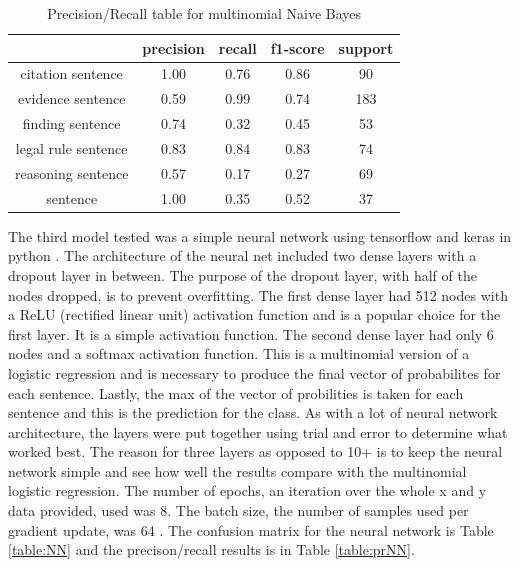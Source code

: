 \documentclass[11pt]{article}
\begin{document}
\vspace{1.4em}
\begin{table}
  \centering
  \begin{tabular}{| c | c | c | c | c |}
    \hline
    &                   precision  &   recall &  f1-score  &  support \\
    \hline
    citation sentence &       1.00 &     0.76 &     0.86 &       90 \\
    evidence sentence &       0.59 &     0.99 &     0.74 &      183 \\
    finding sentence &       0.74 &     0.32 &     0.45 &       53 \\
    legal rule sentence &    0.83 &     0.84 &     0.83 &       74 \\
    reasoning sentence &       0.57 &     0.17 &     0.27 &       69 \\
    sentence           &       1.00 &     0.35 &     0.52 &       37 \\
    \hline
  \end{tabular}
  \caption{Precision/Recall table for multinomial Naive Bayes}
  \label{table:prLR}
\end{table}
\vspace{0.3em}



The third model tested was a simple neural network using tensorflow and keras in python \cite{tensorflow2015-whitepaper}. The architecture of the neural net included two dense layers with a dropout layer in between. The purpose of the dropout layer, with half of the nodes dropped, is to prevent overfitting. The first dense layer had 512 nodes with a ReLU (rectified linear unit) activation function and is a popular choice for the first layer. It is a simple activation function. The second dense layer had only 6 nodes and a softmax activation function. This is a multinomial version of a logistic regression and is necessary to produce the final vector of probabilites for each sentence. Lastly, the max of the vector of probilities is taken for each sentence and this is the prediction for the class. As with a lot of neural network architecture, the layers were put together using trial and error to determine what worked best. The reason for three layers as opposed to 10+ is to keep the neural network simple and see how well the results compare with the multinomial logistic regression. The number of epochs, an iteration over the whole x and y data provided, used was 8. The batch size, the number of samples used per gradient update, was 64 \cite{tensorflow2015-whitepaper}. The confusion matrix for the neural network is Table \ref{table:NN} and the precison/recall results is in Table \ref{table:prNN}.
\end{document}
